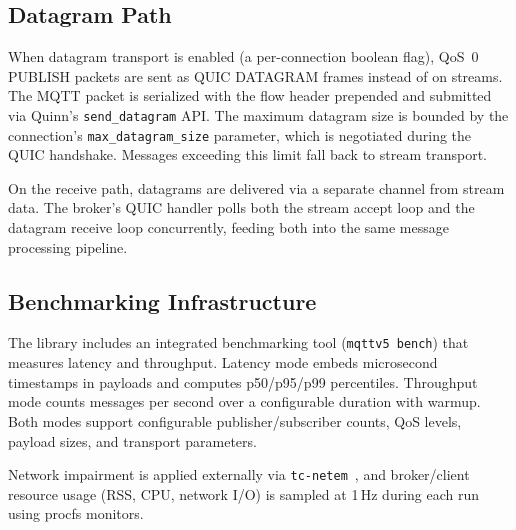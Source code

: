 \subsection{Datagram Path}

When datagram transport is enabled (a per-connection boolean flag), QoS~0 PUBLISH packets are sent as QUIC DATAGRAM frames instead of on streams. The MQTT packet is serialized with the flow header prepended and submitted via Quinn's \texttt{send\_datagram} API. The maximum datagram size is bounded by the connection's \texttt{max\_datagram\_size} parameter, which is negotiated during the QUIC handshake. Messages exceeding this limit fall back to stream transport.

On the receive path, datagrams are delivered via a separate channel from stream data. The broker's QUIC handler polls both the stream accept loop and the datagram receive loop concurrently, feeding both into the same message processing pipeline.

\subsection{Benchmarking Infrastructure}

The library includes an integrated benchmarking tool (\texttt{mqttv5 bench}) that measures latency and throughput. Latency mode embeds microsecond timestamps in payloads and computes p50/p95/p99 percentiles. Throughput mode counts messages per second over a configurable duration with warmup. Both modes support configurable publisher/subscriber counts, QoS levels, payload sizes, and transport parameters.

Network impairment is applied externally via \texttt{tc-netem}~\cite{hemminger2005netem}, and broker/client resource usage (RSS, CPU, network I/O) is sampled at 1\,Hz during each run using procfs monitors.
